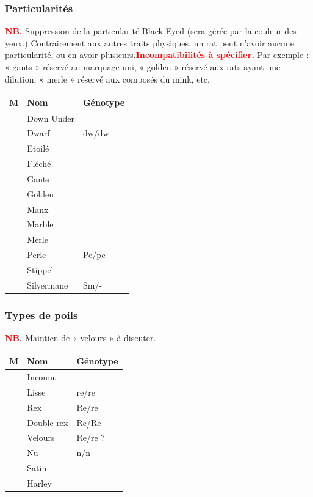 ﻿\documentclass[a4paper,10pt]{article}
\newcommand\desire[1]{\noindent\textbf{\textcolor{red}{#1}}}
\begin{document}
\subsubsection{Particularités}
\desire{NB.} Suppression de la particularité Black-Eyed (sera gérée par la couleur des yeux.) Contrairement aux autres traits physiques, un rat peut n'avoir aucune particularité, ou en avoir plusieurs.\desire{Incompatibilités à spécifier.} Par exemple : « gants » réservé au marquage uni, « golden » réservé aux rats ayant une dilution, « merle » réservé aux composés du mink, etc.

\begin{longtable}{|c|l|l|}\hline
\textbf{M} & \textbf{Nom} & \textbf{Génotype} \\\hline
 &  Down Under & \\\hline
 &  Dwarf & dw/dw\\\hline
 &  Etoilé & \\\hline
 &  Fléché & \\\hline
 &  Gants & \\\hline
 &  Golden& \\\hline
 &  Manx& \\\hline
 &  Marble& \\\hline
 &  Merle& \\\hline
 &  Perle& Pe/pe\\\hline
 &  Stippel& \\\hline
 &  Silvermane& Sm/-\\\hline
\end{longtable}

\subsubsection{Types de poils}
\desire{NB.} Maintien de « velours » à discuter.
   
\begin{longtable}{|c|l|l|}\hline
\textbf{M} & \textbf{Nom} & \textbf{Génotype}\\\hline
 &  Inconnu &\\\hline
 &  Lisse & re/re \\\hline
 &  Rex & Re/re \\\hline
 &  Double-rex & Re/Re\\\hline
 &  Velours & Re/re ?\\\hline
 &  Nu & n/n \\\hline
 &  Satin & \\\hline
 &  Harley & \\\hline
\end{longtable}
\end{document}
